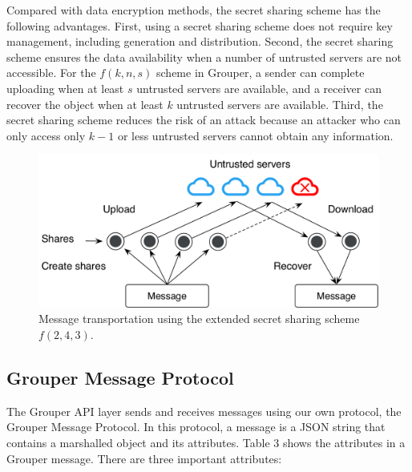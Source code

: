 \documentclass{sig-alternate-05-2015}
\begin{document}
Compared with data encryption methods, the secret sharing scheme has the following advantages.
First, using a secret sharing scheme does not require key management, including generation and distribution.
Second, the secret sharing scheme ensures the data availability when a number of untrusted servers are not accessible.
For the $f(k, n, s)$ scheme in Grouper, a sender can complete uploading when at least $s$ untrusted servers are available, and a receiver can recover the object when at least $k$ untrusted servers are available.
Third, the secret sharing scheme reduces the risk of an attack because an attacker who can only access only $k-1$ or less untrusted servers cannot obtain any information.

\begin{figure}[t]
	\centering
	\includegraphics[scale=0.4]{transportation}
	\caption{Message transportation using the extended secret sharing scheme $f(2, 4, 3)$.}
\end{figure}

\subsection{Grouper Message Protocol}

The Grouper API layer sends and receives messages using our own protocol, the Grouper Message Protocol.
In this protocol, a message is a JSON string that contains a marshalled object and its attributes.
Table 3 shows the attributes in a Grouper message.
There are three important attributes:
\end{document}
